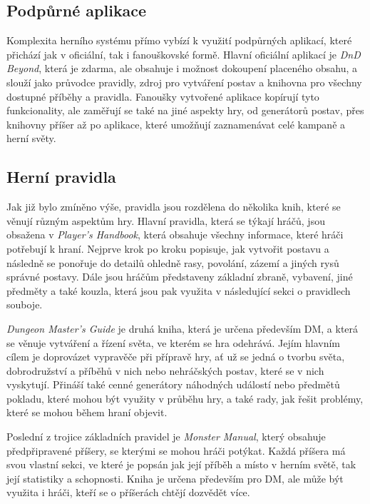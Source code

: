 \subsection{Podpůrné aplikace}
\label{subsec:dnd_apps}

Komplexita herního systému \dnd{} přímo vybízí k využití podpůrných aplikací, které přichází jak v oficiální, tak i fanouškovské formě. Hlavní oficiální aplikací je \textit{DnD Beyond}, která je zdarma, ale obsahuje i možnost dokoupení placeného obsahu, a slouží jako průvodce pravidly, zdroj pro vytváření postav a knihovna pro všechny dostupné příběhy a pravidla. Fanoušky vytvořené aplikace kopírují tyto funkcionality, ale zaměřují se také na jiné aspekty hry, od generátorů postav, přes knihovny příšer až po aplikace, které umožňují zaznamenávat celé kampaně a herní světy.

\subsection{Herní pravidla}
\label{subsec:dnd_rules}

Jak již bylo zmíněno výše, pravidla \dnd{} jsou rozdělena do několika knih, které se věnují různým aspektům hry. Hlavní pravidla, která se týkají hráčů, jsou obsažena v \textit{Player's Handbook}, která obsahuje všechny informace, které hráči potřebují k hraní. Nejprve krok po kroku popisuje, jak vytvořit postavu a následně se ponořuje do detailů ohledně rasy, povolání, zázemí a jiných rysů správné postavy. Dále jsou hráčům představeny základní zbraně, vybavení, jiné předměty a také kouzla, která jsou pak využita v následující sekci o pravidlech souboje.

\textit{Dungeon Master's Guide} je druhá kniha, která je určena především DM, a která se věnuje vytváření a řízení světa, ve kterém se hra odehrává. Jejím hlavním cílem je doprovázet vypravěče při přípravě hry, ať už se jedná o tvorbu světa, dobrodružství a příběhů v nich nebo nehráčských postav, které se v nich vyskytují. Přináší také cenné generátory náhodných událostí nebo předmětů pokladu, které mohou být využity v průběhu hry, a také rady, jak řešit problémy, které se mohou během hraní objevit.

Poslední z trojice základních pravidel je \textit{Monster Manual}, který obsahuje předpřipravené příšery, se kterými se mohou hráči potýkat. Každá příšera má svou vlastní sekci, ve které je popsán jak její příběh a místo v herním světě, tak její statistiky a schopnosti. Kniha je určena především pro DM, ale může být využita i hráči, kteří se o příšerách chtějí dozvědět více.

